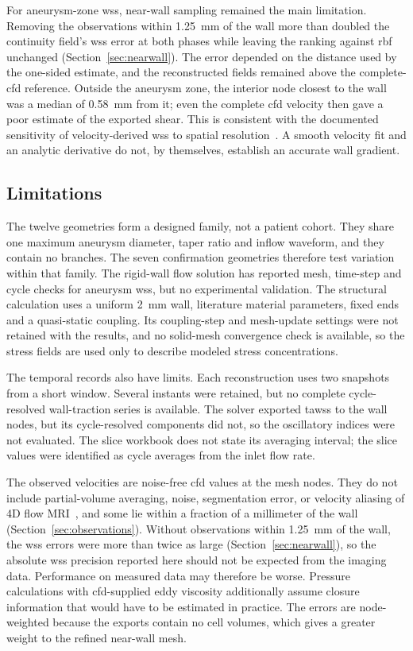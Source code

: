 \documentclass[12pt,a4paper]{article}
\newcommand{\CFD}{\ac{cfd}\xspace}
\newcommand{\WSS}{\ac{wss}\xspace}
\newcommand{\TAWSS}{\ac{tawss}\xspace}
\newcommand{\RBF}{\ac{rbf}\xspace}
\theoremstyle{definition}
\numberwithin{equation}{section}
\begin{document}
For aneurysm-zone \WSS, near-wall sampling remained the main limitation. Removing the observations within 1.25~mm of the wall more than doubled the continuity field's \WSS error at both phases while leaving the ranking against \RBF unchanged (Section~\ref{sec:nearwall}). The error depended on the distance used by the one-sided estimate, and the reconstructed fields remained above the complete-\CFD reference. Outside the aneurysm zone, the interior node closest to the wall was a median of 0.58~mm from it; even the complete \CFD velocity then gave a poor estimate of the exported shear. This is consistent with the documented sensitivity of velocity-derived \WSS to spatial resolution~\cite{petersson2012assessment,stalder2008quantitative}. A smooth velocity fit and an analytic derivative do not, by themselves, establish an accurate wall gradient.

\subsection{Limitations}
\label{Limitations}
The twelve geometries form a designed family, not a patient cohort. They share one maximum aneurysm diameter, taper ratio and inflow waveform, and they contain no branches. The seven confirmation geometries therefore test variation within that family. The rigid-wall flow solution has reported mesh, time-step and cycle checks for aneurysm \WSS, but no experimental validation. The structural calculation uses a uniform 2~mm wall, literature material parameters, fixed ends and a quasi-static coupling. Its coupling-step and mesh-update settings were not retained with the results, and no solid-mesh convergence check is available, so the stress fields are used only to describe modeled stress concentrations.

The temporal records also have limits. Each reconstruction uses two snapshots from a short window. Several instants were retained, but no complete cycle-resolved wall-traction series is available. The solver exported \TAWSS to the wall nodes, but its cycle-resolved components did not, so the oscillatory indices were not evaluated. The slice workbook does not state its averaging interval; the slice values were identified as cycle averages from the inlet flow rate.

The observed velocities are noise-free \CFD values at the mesh nodes. They do not include partial-volume averaging, noise, segmentation error, or velocity aliasing of 4D flow MRI~\cite{markl2012fourd}, and some lie within a fraction of a millimeter of the wall (Section~\ref{sec:observations}). Without observations within 1.25~mm of the wall, the \WSS errors were more than twice as large (Section~\ref{sec:nearwall}), so the absolute \WSS precision reported here should not be expected from the imaging data. Performance on measured data may therefore be worse. Pressure calculations with \CFD-supplied eddy viscosity additionally assume closure information that would have to be estimated in practice. The errors are node-weighted because the exports contain no cell volumes, which gives a greater weight to the refined near-wall mesh.
\end{document}
